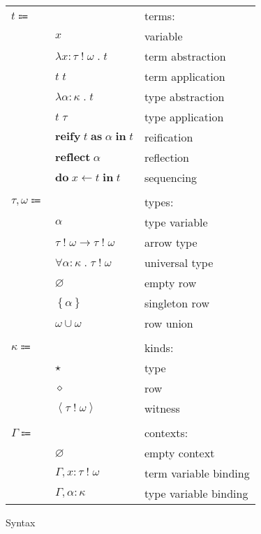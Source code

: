 \documentclass[12pt]{article}
\newcommand\kAnno[2]{#1 : #2}
\newcommand\tAnno[3]{#1 : \tEmbellished{#2}{#3}}
\newcommand\term{t}
\newcommand\eVar{x}
\newcommand\eAbs[4]{\lambda \tAnno{#1}{#2}{#3} \; . \; #4}
\newcommand\eApp[2]{#1 \; #2}
\newcommand\eTAbs[3]{\lambda \kAnno{#1}{#2} \; . \; #3}
\newcommand\eTApp[2]{#1 \; #2}
\newcommand\eReify[3]{\textbf{reify} \; #1 \; \textbf{as} \; #2 \; \textbf{in} \; #3}
\newcommand\eReflect[1]{\textbf{reflect} \; #1}
\newcommand\eDo[3]{\textbf{do} \; #1 \leftarrow #2 \; \textbf{in} \; #3}
\newcommand\type{\tau}
\newcommand\tVar{\alpha}
\newcommand\tArrow[4]{\tEmbellished{#1}{#2} \rightarrow \tEmbellished{#3}{#4}}
\newcommand\tForAll[4]{\forall \kAnno{#1}{#2} \; . \; \tEmbellished{#3}{#4}}
\newcommand\row{\omega}
\newcommand\tEmbellished[2]{#1 \; ! \; #2}
\newcommand\tEmpty{\varnothing}
\newcommand\tSingleton[1]{\left\{ #1 \right\}}
\newcommand\tUnion[2]{#1 \cup #2}
\newcommand\kind{\kappa}
\newcommand\kType{\star}
\newcommand\kRow{\diamond}
\newcommand\kWitness[2]{\left\langle \tEmbellished{#1}{#2} \right\rangle}
\newcommand\context{\Gamma}
\newcommand\cEmpty{\varnothing}
\newcommand\cEExtend[4]{#1, \tAnno{#2}{#3}{#4}}
\newcommand\cTExtend[3]{#1, \kAnno{#2}{#3}}
\begin{document}
      \begin{figure}[H]
        \begin{mdframed}[backgroundcolor=none]
          \begin{center}
            \begin{tabular}{l l l}
              $\term \Coloneqq$ & & terms: \\
              & $\eVar$ & variable \\
              & $\eAbs{\eVar}{\type}{\row}{\term}$ & term abstraction \\
              & $\eApp{\term}{\term}$ & term application \\
              & $\eTAbs{\tVar}{\kind}{\term}$ & type abstraction \\
              & $\eTApp{\term}{\type}$ & type application \\
              & $\eReify{\term}{\tVar}{\term}$ & reification \\
              & $\eReflect{\tVar}$ & reflection \\
              & $\eDo{\eVar}{\term}{\term}$ & sequencing \\
              \\
              $\type, \row \Coloneqq$ & & types: \\
              & $\tVar$ & type variable \\
              & $\tArrow{\type}{\row}{\type}{\row}$ & arrow type \\
              & $\tForAll{\tVar}{\kind}{\type}{\row}$ & universal type \\
              & $\tEmpty$ & empty row \\
              & $\tSingleton{\tVar}$ & singleton row \\
              & $\tUnion{\row}{\row}$ & row union \\
              \\
              $\kind \Coloneqq$ & & kinds: \\
              & $\kType$ & type \\
              & $\kRow$ & row \\
              & $\kWitness{\type}{\row}$ & witness \\
              \\
              $\context \Coloneqq$ & & contexts: \\
              & $\cEmpty$ & empty context \\
              & $\cEExtend{\context}{\eVar}{\type}{\row}$ & term variable binding \\
              & $\cTExtend{\context}{\tVar}{\kind}$ & type variable binding \\
            \end{tabular}
          \end{center}

          \caption{Syntax}\label{fig:syntax}
        \end{mdframed}
      \end{figure}
\end{document}
